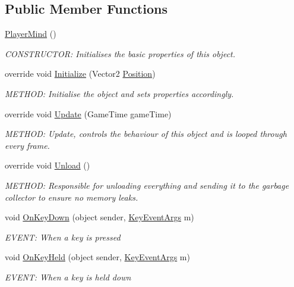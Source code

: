 \subsection*{Public Member Functions}
\begin{DoxyCompactItemize}
\item 
\hyperlink{a00326_a67a26082f1d70a5c4495cb0ece0cce33}{Player\+Mind} ()
\begin{DoxyCompactList}\small\item\em C\+O\+N\+S\+T\+R\+U\+C\+T\+OR\+: Initialises the basic properties of this object. \end{DoxyCompactList}\item 
override void \hyperlink{a00326_a44a3007533c5d73810c4636fcfef5988}{Initialize} (Vector2 \hyperlink{a00318_ad94b3975c0873fee06b5bd5a75bd38cd}{Position})
\begin{DoxyCompactList}\small\item\em M\+E\+T\+H\+OD\+: Initialise the object and sets properties accordingly. \end{DoxyCompactList}\item 
override void \hyperlink{a00326_a172dca0ea26dfd821b413f7592a98084}{Update} (Game\+Time game\+Time)
\begin{DoxyCompactList}\small\item\em M\+E\+T\+H\+OD\+: Update, controls the behaviour of this object and is looped through every frame. \end{DoxyCompactList}\item 
override void \hyperlink{a00326_a80bacdc33e51129afed33f9e8bd5cd0f}{Unload} ()
\begin{DoxyCompactList}\small\item\em M\+E\+T\+H\+OD\+: Responsible for unloading everything and sending it to the garbage collector to ensure no memory leaks. \end{DoxyCompactList}\item 
void \hyperlink{a00326_a2c9b5d3a4834dc7446584a802460837f}{On\+Key\+Down} (object sender, \hyperlink{a00362}{Key\+Event\+Args} m)
\begin{DoxyCompactList}\small\item\em E\+V\+E\+NT\+: When a key is pressed \end{DoxyCompactList}\item 
void \hyperlink{a00326_ab3295433000f4defc2a420d9758c218e}{On\+Key\+Held} (object sender, \hyperlink{a00362}{Key\+Event\+Args} m)
\begin{DoxyCompactList}\small\item\em E\+V\+E\+NT\+: When a key is held down \end{DoxyCompactList}\item 

\end{DoxyCompactItemize}
